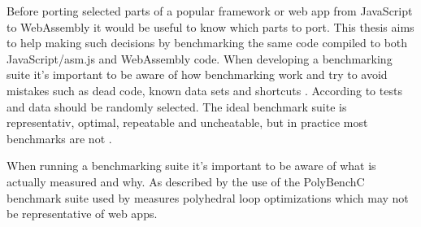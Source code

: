 
Before porting selected parts of a popular framework or web app from JavaScript to WebAssembly it would be useful to know which parts to port. This thesis aims to help making such decisions by benchmarking the same code compiled to both JavaScript/asm.js and WebAssembly code. When developing a benchmarking suite it's important to be aware of how benchmarking work and try to avoid mistakes such as dead code, known data sets and shortcuts \parencite{CaiNerurkarWu1998}. According to \textcite{CaiNerurkarWu1998} tests and data should be randomly selected. The ideal benchmark suite is representativ, optimal, repeatable and uncheatable, but in practice most benchmarks are not \parencite{CaiNerurkarWu1998}.


When running a benchmarking suite it's important to be aware of what is actually measured and why. As described by \textcite{JangdaPowersGuhaBerger2019} the use of the PolyBenchC benchmark suite used by \textcite{HaasRossbergSchuffTitzerHolmanGohmanWagnerZakaiBastien2017} measures polyhedral loop optimizations which may not be representative of web apps.


